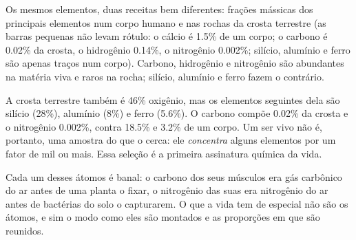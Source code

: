 \begin{omfigure}

{\small Os mesmos elementos, duas receitas bem diferentes: frações
mássicas dos principais elementos num corpo humano e nas rochas da
crosta terrestre (as barras pequenas não levam rótulo: o cálcio é 1.5\%
de um corpo; o carbono é 0.02\% da crosta, o hidrogênio 0.14\%, o
nitrogênio 0.002\%; silício, alumínio e ferro são apenas traços num
corpo). Carbono, hidrogênio e nitrogênio são abundantes na matéria viva
e raros na rocha; silício, alumínio e ferro fazem o contrário.}
\end{omfigure}

\begin{example}\label{ex:g10:chemistry-of-life:crust}
A crosta terrestre também é 46\% oxigênio, mas os elementos seguintes
dela são silício (28\%), alumínio (8\%) e ferro (5.6\%). O carbono
compõe 0.02\% da crosta e o nitrogênio 0.002\%, contra 18.5\% e 3.2\% de
um corpo. Um ser vivo não é, portanto, uma amostra do que o cerca: ele
\emph{concentra} alguns elementos por um fator de mil ou mais. Essa
seleção é a primeira assinatura química da vida.
\end{example}

\begin{remark}\label{rem:g10:chemistry-of-life:origin}
Cada um desses átomos é banal: o carbono dos seus músculos era gás
carbônico do ar antes de uma planta o fixar, o nitrogênio das suas
 era nitrogênio do ar antes de bactérias do solo o
capturarem. O que a vida tem de especial não são os átomos, e sim o
modo como eles são montados e as proporções em que são reunidos.
\end{remark}

